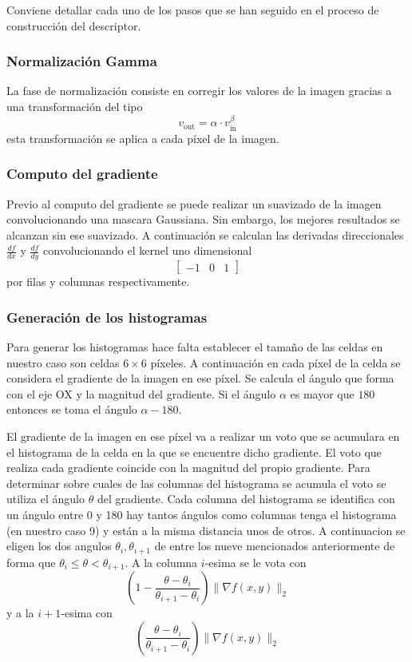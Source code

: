 \documentclass[a4paper,12pt]{article}
\begin{document}
Conviene detallar cada uno de los pasos que se han seguido en el
proceso de construcción del descriptor.

\subsubsection{Normalización Gamma}

La fase de normalización consiste en corregir los valores de la
imagen gracias a una transformación del tipo
\[
  v_{\text{out}} = \alpha \cdot v_{\text{in}}^\beta
\]
esta transformación se aplica a cada píxel de la imagen.

\subsubsection{Computo del gradiente}

Previo al computo del gradiente se puede realizar un suavizado de
la imagen convolucionando una mascara Gaussiana. Sin embargo, los mejores resultados se alcanzan sin ese suavizado.  A continuación
se calculan las derivadas direccionales $\frac{df}{dx}$ y
$\frac{df}{dy}$ convolucionando el kernel uno dimensional
\[
  \begin{bmatrix}-1 & 0 & 1\end{bmatrix}
\]
por filas y columnas respectivamente.

\subsubsection{Generación de los histogramas}

Para generar los histogramas hace falta establecer el tamaño de las
celdas en nuestro caso son celdas $6\times 6$ píxeles. A
continuación en cada píxel de la celda se considera el gradiente de
la imagen en ese píxel. Se calcula el ángulo que forma con el eje
OX y la magnitud del gradiente. Si el ángulo $\alpha$ es mayor que
$180$ entonces se toma el ángulo $\alpha - 180$.

El gradiente de la imagen en ese píxel va a realizar un voto que
se acumulara en el histograma de la celda en la que se encuentre
dicho gradiente. El voto que realiza cada gradiente coincide con
la magnitud del propio gradiente. Para determinar sobre cuales
de las columnas del histograma se acumula el voto se utiliza el
ángulo $\theta$ del gradiente. Cada columna del histograma se
identifica con un ángulo entre 0 y 180 hay tantos ángulos como
columnas tenga el histograma (en nuestro caso 9) y están a la misma
distancia unos de otros. A continuacion se eligen los dos angulos
$\theta_i,\theta_{i+1}$ de entre los nueve mencionados anteriormente
de forma que $ \theta_i \le \theta < \theta_{i+1} $. A la columna
$i$-esima se le vota con
\[
  (1-\frac{\theta-\theta_i}{\theta_{i+1} - \theta_i})\| \nabla f (x,y)\|_2
\]
y a la $i+1$-esima con
\[
  (\frac{\theta-\theta_i}{\theta_{i+1} - \theta_i})\| \nabla f (x,y)\|_2
\]
\end{document}
